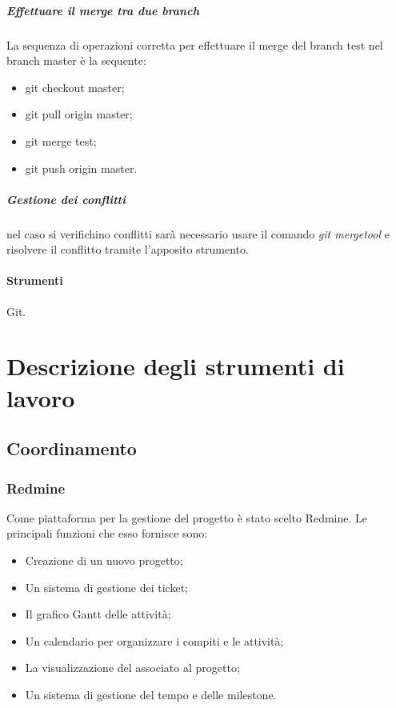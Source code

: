 \subparagraph{Effettuare il merge tra due branch}
\label{merge}
La sequenza di operazioni corretta per effettuare il merge del branch test nel branch master è la sequente:
\begin{itemize}
\item git checkout master;
\item git pull origin master;
\item git merge test;
\item git push origin master.
\end{itemize}

\subparagraph{Gestione dei conflitti} nel caso si verifichino conflitti sarà necessario usare il comando \textit{git mergetool} e risolvere il conflitto tramite l'apposito strumento.

\paragraph{Strumenti}
Git.




\appendix
\newpage
\section{Descrizione degli strumenti di lavoro}


\subsection{Coordinamento}

\subsubsection{Redmine}
\label{4.1}
Come piattaforma per la gestione del progetto è stato scelto Redmine. Le principali funzioni che esso fornisce sono:
\begin{itemize}
\item Creazione di un nuovo progetto;
\item Un sistema di gestione dei ticket;
\item Il grafico Gantt delle attività;
\item Un calendario per organizzare i compiti e le attività;
\item La visualizzazione del  associato al progetto;
\item Un sistema di  gestione del tempo e delle milestone.
\end{itemize}



